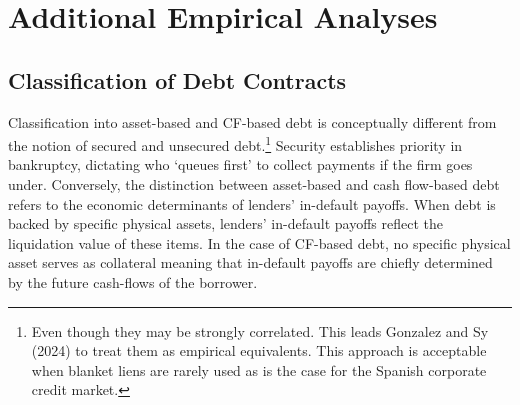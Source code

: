 \documentclass[12pt]{article}
\begin{document}
\begin{table}[H]
    \centering
    \caption{\small Summary Statistics - debt contracts between 2010Q1 and 2023Q2}
    \label{tab:sumstat2}
\end{table}

\section{Additional Empirical Analyses}

\subsection{Classification of Debt Contracts \label{sec:classification}}
Classification into asset-based and CF-based debt is conceptually different from the notion of secured and unsecured debt.\footnote{Even though they may be strongly correlated. This leads Gonzalez and Sy (2024) to treat them as empirical equivalents. This approach is acceptable when blanket liens are rarely used as is the case for the Spanish corporate credit market.} Security establishes priority in bankruptcy, dictating who `queues first' to collect payments if the firm goes under. Conversely, the distinction between asset-based and cash flow-based debt refers to the economic determinants of lenders' in-default payoffs. When debt is backed by specific physical assets, lenders' in-default payoffs reflect the liquidation value of these items. In the case of CF-based debt, no specific physical asset serves as collateral meaning that in-default payoffs are chiefly determined by the future cash-flows of the borrower. 
\end{document}
